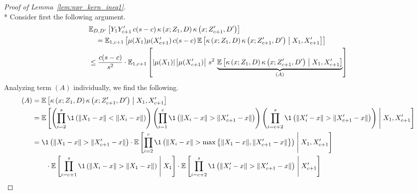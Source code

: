 \begin{proof}[Proof of Lemma~\ref{lem:npr_kern_ineq1}]\mbox{}\\*
	Consider first the following argument.
	\begin{equation}
		\begin{aligned}
			 & \mathbb{E}_{D, D^{\prime}}\left[Y_{1}Y_{c+1}^{\prime} \, c(s-c) \, \kappa\left(x; Z_{1}, D\right)\kappa\left(x; Z_{c+1}^{\prime}, D^{\prime}\right)\right]          \\
			 & \quad = \mathbb{E}_{1, c+1}\left[\mu(X_1) \mu(X_{c+1}^{\prime}) \, c(s-c) \,
			\mathbb{E}\left[\kappa\left(x; Z_{1}, D\right)\kappa\left(x; Z_{c+1}^{\prime}, D^{\prime}\right) \; \middle| \; X_1, X_{c+1}^{\prime}\right]\right]                    \\
			 & \leq \frac{c(s-c)}{s^2} \cdot \mathbb{E}_{1, c+1}\left[\left|\mu(X_1)\right| \left|\mu(X_{c+1}^{\prime})\right| \, s^2 \,
			\underbrace{\mathbb{E}\left[\kappa\left(x; Z_{1}, D\right)\kappa\left(x; Z_{c+1}^{\prime}, D^{\prime}\right) \; \middle| \; X_1, X_{c+1}^{\prime}\right]}_{(A)}\right] \\
		\end{aligned}
	\end{equation}
	Analyzing term $(A)$ individually, we find the following.
	\begin{equation}
		\begin{aligned}
			(A)
			 & = \E\left[\kappa\left(x; Z_{1}, D\right)\kappa\left(x; Z_{c+1}^{\prime}, D^{\prime}\right) \; \middle| \; X_1, X_{c+1}^{\prime}\right]                                                                                       \\
			 & = \E\left[\left(\prod_{i = 2}^{s}\1\left(\|X_1 - x\| < \|X_{i} - x\|\right)\right)
				\left(\prod_{i = 1}^{c}\1\left(\|X_i - x\| > \|X_{c+1}^{\prime} - x\|\right)\right)
			\left(\prod_{i = c+2}^{s}\1\left(\|X_i^{\prime} - x\| > \|X_{c+1}^{\prime} - x\|\right)\right) \; \middle| \; X_1, X_{c+1}^{\prime}\right]                                                                                      \\
			 & = \1\left(\|X_1 - x\| > \|X_{c+1}^{\prime} - x\|\right) \cdot \E\left[\prod_{i = 2}^{c}\1\left(\|X_{i} - x\| > \max\left\{\|X_{1} - x\|, \|X_{c+1}^{\prime} - x\|\right\}\right) \; \middle| \; X_1, X_{c+1}^{\prime}\right] \\
			 & \quad \quad  \cdot \E\left[\prod_{i = c+1}^{s}\1\left(\|X_i - x\| > \|X_{1} - x\|\right) \; \middle| \; X_{1}\right]
			\cdot \E\left[\prod_{i = c+2}^{s}\1\left(\|X_i^{\prime} - x\| > \|X_{c+1}^{\prime} - x\|\right) \; \middle| \; X_{c+1}^{\prime}\right]                                                                                          \\

\end{aligned}
\end{equation}
\end{proof}
